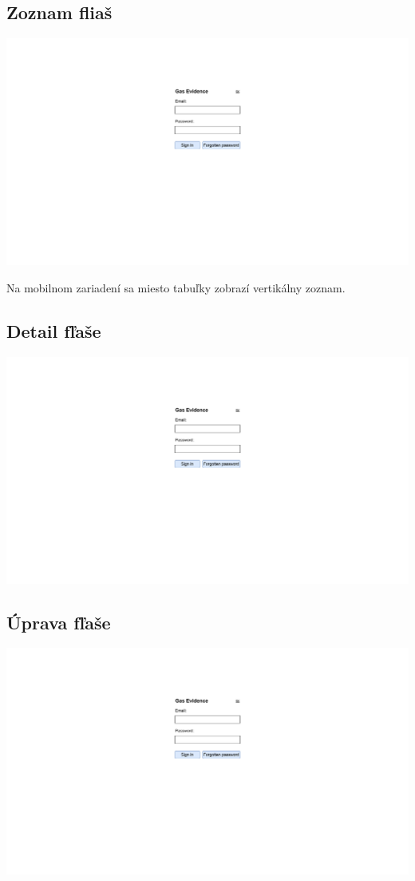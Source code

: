 \documentclass{zah}
\begin{document}
\subsection{Zoznam fliaš}
\begin{center}
\includegraphics[width=.7\textwidth,page=3]{navrh-assets/ui}
\end{center}

Na mobilnom zariadení sa miesto tabuľky zobrazí vertikálny zoznam.

\subsection{Detail fľaše}
\begin{center}
\includegraphics[width=.7\textwidth,page=4]{navrh-assets/ui}
\end{center}

\subsection{Úprava fľaše}
\begin{center}
\includegraphics[width=.7\textwidth,page=5]{navrh-assets/ui}
\end{center}
\end{document}
